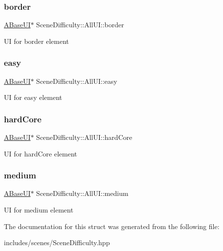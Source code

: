 \subsubsection{\texorpdfstring{border}{border}}
{\footnotesize\ttfamily \hyperlink{class_a_base_u_i}{A\+Base\+UI}$\ast$ Scene\+Difficulty\+::\+All\+U\+I\+::border}

UI for border element \mbox{\label{struct_scene_difficulty_1_1_all_u_i_acb9d7c8cb4617cfc353f475bec54b19e}} 
\subsubsection{\texorpdfstring{easy}{easy}}
{\footnotesize\ttfamily \hyperlink{class_a_base_u_i}{A\+Base\+UI}$\ast$ Scene\+Difficulty\+::\+All\+U\+I\+::easy}

UI for easy element \mbox{\label{struct_scene_difficulty_1_1_all_u_i_a0d3c51dfb0a9635f2bc4d76fe707b3a3}} 
\subsubsection{\texorpdfstring{hard\+Core}{hardCore}}
{\footnotesize\ttfamily \hyperlink{class_a_base_u_i}{A\+Base\+UI}$\ast$ Scene\+Difficulty\+::\+All\+U\+I\+::hard\+Core}

UI for hard\+Core element \mbox{\label{struct_scene_difficulty_1_1_all_u_i_a19bd705042ffd4a8d8bddf7aa4959ae4}} 
\subsubsection{\texorpdfstring{medium}{medium}}
{\footnotesize\ttfamily \hyperlink{class_a_base_u_i}{A\+Base\+UI}$\ast$ Scene\+Difficulty\+::\+All\+U\+I\+::medium}

UI for medium element 

The documentation for this struct was generated from the following file\+:\begin{DoxyCompactItemize}
\item 
includes/scenes/Scene\+Difficulty.\+hpp\end{DoxyCompactItemize}
